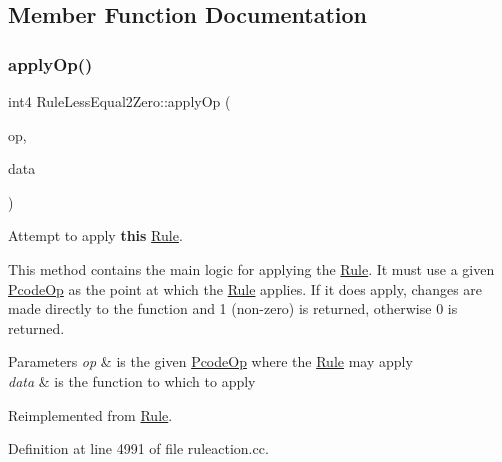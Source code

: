 \subsection{Member Function Documentation}
\mbox{\label{class_rule_less_equal2_zero_a1d41372d5ac60e36cca1ffcb04e33528}} 
\subsubsection{\texorpdfstring{applyOp()}{applyOp()}}
{\footnotesize\ttfamily int4 Rule\+Less\+Equal2\+Zero\+::apply\+Op (\begin{DoxyParamCaption}\item[{\mbox{\hyperlink{class_pcode_op}{Pcode\+Op}} $\ast$}]{op,  }\item[{\mbox{\hyperlink{class_funcdata}{Funcdata}} \&}]{data }\end{DoxyParamCaption})\hspace{0.3cm}{\ttfamily [virtual]}}



Attempt to apply {\bfseries{this}} \mbox{\hyperlink{class_rule}{Rule}}. 

This method contains the main logic for applying the \mbox{\hyperlink{class_rule}{Rule}}. It must use a given \mbox{\hyperlink{class_pcode_op}{Pcode\+Op}} as the point at which the \mbox{\hyperlink{class_rule}{Rule}} applies. If it does apply, changes are made directly to the function and 1 (non-\/zero) is returned, otherwise 0 is returned. 
\begin{DoxyParams}{Parameters}
{\em op} & is the given \mbox{\hyperlink{class_pcode_op}{Pcode\+Op}} where the \mbox{\hyperlink{class_rule}{Rule}} may apply \\
\hline
{\em data} & is the function to which to apply \\
\hline
\end{DoxyParams}


Reimplemented from \mbox{\hyperlink{class_rule_a4e3e61f066670175009f60fb9dc60848}{Rule}}.



Definition at line 4991 of file ruleaction.\+cc.

